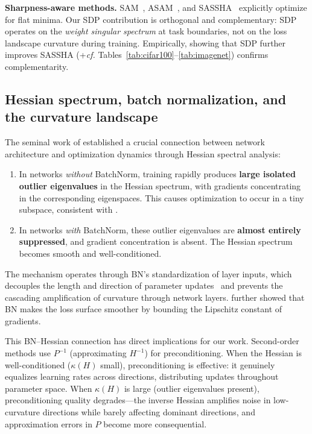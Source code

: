 \documentclass{article}
\begin{document}
\textbf{Sharpness-aware methods.} SAM~\citep{foret2021sam}, ASAM~\citep{kwon2021asam}, and SASSHA~\citep{shin2025sassha} explicitly optimize for flat minima. Our SDP contribution is orthogonal and complementary: SDP operates on the \emph{weight singular spectrum} at task boundaries, not on the loss landscape curvature during training. Empirically, showing that SDP further improves SASSHA (+\textit{cf.} Tables~\ref{tab:cifar100}--\ref{tab:imagenet}) confirms complementarity.

\subsection{Hessian spectrum, batch normalization, and the curvature landscape}
\label{sec:bg_hessian}

The seminal work of \citet{ghorbani2019investigation} established a crucial connection between network architecture and optimization dynamics through Hessian spectral analysis:
\begin{enumerate}[leftmargin=*,nosep]
    \item In networks \emph{without} BatchNorm, training rapidly produces \textbf{large isolated outlier eigenvalues} in the Hessian spectrum, with gradients concentrating in the corresponding eigenspaces. This causes optimization to occur in a tiny subspace, consistent with \citet{gurari2018gradient}.
    \item In networks \emph{with} BatchNorm, these outlier eigenvalues are \textbf{almost entirely suppressed}, and gradient concentration is absent. The Hessian spectrum becomes smooth and well-conditioned.
\end{enumerate}

The mechanism operates through BN's standardization of layer inputs, which decouples the length and direction of parameter updates~\citep{kohler2019batchnorm} and prevents the cascading amplification of curvature through network layers. \citet{santurkar2018does} further showed that BN makes the loss surface smoother by bounding the Lipschitz constant of gradients.

This BN--Hessian connection has direct implications for our work. Second-order methods use $P^{-1}$ (approximating $H^{-1}$) for preconditioning. When the Hessian is well-conditioned ($\kappa(H)$ small), preconditioning is effective: it genuinely equalizes learning rates across directions, distributing updates throughout parameter space. When $\kappa(H)$ is large (outlier eigenvalues present), preconditioning quality degrades---the inverse Hessian amplifies noise in low-curvature directions while barely affecting dominant directions, and approximation errors in $P$ become more consequential.
\end{document}
